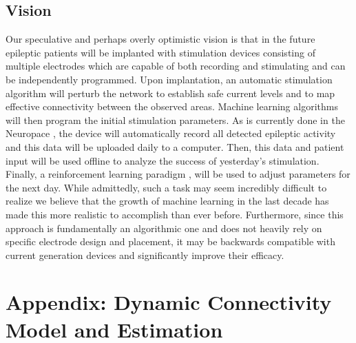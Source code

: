 \documentclass[11pt,a4paper,final]{article}
\begin{document}
\subsection{Vision}

Our speculative and perhaps overly optimistic vision is that in the future epileptic patients will be implanted with stimulation devices consisting of multiple electrodes which are capable of both recording and stimulating \citep{ryapolova14} and can be independently programmed.
Upon implantation, an automatic stimulation algorithm will perturb the network to establish safe current levels and to map effective connectivity between the observed areas.
Machine learning algorithms will then program the initial stimulation parameters.
As is currently done in the Neuropace \citep{NP}, the device will automatically record all detected epileptic activity and this data will be uploaded daily to a computer.
Then, this data and patient input will be used offline to analyze the success of yesterday's stimulation.
Finally, a reinforcement learning paradigm \citep{gosavi14}, will be used to adjust parameters for the next day.
While admittedly, such a task may seem incredibly difficult to realize we believe that the growth of machine learning in the last decade has made this more realistic to accomplish than ever before.
Furthermore, since this approach is fundamentally an algorithmic one and does not heavily rely on specific electrode design and placement, it may be backwards compatible with current generation devices and significantly improve their efficacy.


 \renewcommand{\theequation}{A\arabic{equation}}
\setcounter{equation}{0}  %
\section*{Appendix: Dynamic Connectivity Model and Estimation}
\end{document}

